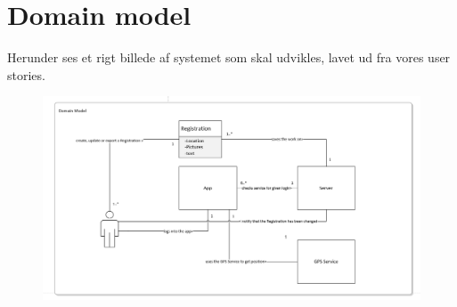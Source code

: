 	\section{Domain model}
Herunder ses et rigt billede af systemet som skal udvikles, lavet ud fra vores user stories.
\begin{figure}[h!]
	\centering
	\includegraphics[width=1\linewidth]{Kravspecifikation/Domainmodel}
\end{figure}
	